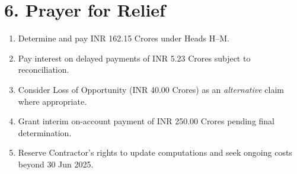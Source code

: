 \documentclass[12pt,letterpaper]{article}
\begin{document}
\section*{6. Prayer for Relief}
\begin{enumerate}
  \item Determine and pay INR 162.15 Crores under Heads H–M.
  \item Pay interest on delayed payments of INR 5.23 Crores subject to reconciliation.
  \item Consider Loss of Opportunity (INR 40.00 Crores) as an \emph{alternative} claim where appropriate.
  \item Grant interim on-account payment of INR 250.00 Crores pending final determination.
  \item Reserve Contractor's rights to update computations and seek ongoing costs beyond 30 Jun 2025.
\end{enumerate}
\end{document}
